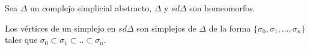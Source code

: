 \begin{Teo}
Sea $\Delta$ un complejo simplicial abstracto, $\Delta$ y $sd\Delta$ son homeomorfos.
\end{Teo}

\begin{Dem}
Los vértices de un simplejo en $sd\Delta$ son simplejos de $\Delta$ de la forma $\{\sigma_0,\sigma_1,...,\sigma_n\}$ tales que $\sigma_0\subset \sigma_1\subset..\subset\sigma_n$.
\end{Dem}
